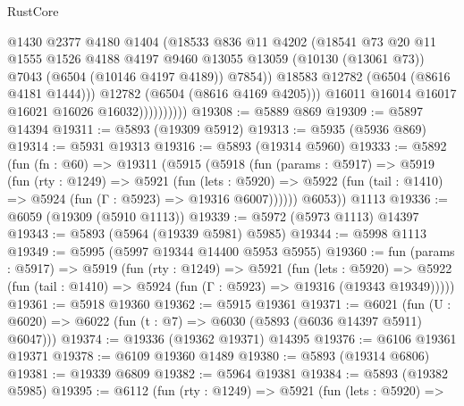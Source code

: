 \begin{lexlean}{RustCore}
\begin{coremodule}
                            @1430
                            @2377
                            @4180
                            @1404
                            (@18533
                              @836
                              @11
                              @4202
                              (@18541
                                @73
                                @20
                                @11
                                @1555
                                @1526
                                @4188
                                @4197
                                @9460
                                @13055
                                @13059
                                (@10130 (@13061 @73))
                                @7043
                                (@6504 (@10146 @4197 @4189))
                                @7854))
                            @18583
                            @12782
                            (@6504 (@8616 @4181 @1444)))
                          @12782
                          (@6504 (@8616 @4169 @4205)))
                        @16011
                        @16014
                        @16017
                        @16021
                        @16026
                        @16032))))))))))
@19308 := @5889 @869
@19309 := @5897 @14394
@19311 := @5893 (@19309 @5912)
@19313 := @5935 (@5936 @869)
@19314 := @5931 @19313
@19316 := @5893 (@19314 @5960)
@19333 := @5892
    (fun (fn : @60) =>
    @19311
      (@5915
        (@5918
          (fun (params : @5917) =>
          @5919
            (fun (rty : @1249) =>
            @5921
              (fun (lets : @5920) =>
              @5922 (fun (tail : @1410) => @5924 (fun (Γ : @5923) => @19316 @6007))))))
        @6053))
    @1113
@19336 := @6059 (@19309 (@5910 @1113))
@19339 := @5972 (@5973 @1113) @14397
@19343 := @5893 (@5964 (@19339 @5981) @5985)
@19344 := @5998 @1113
@19349 := @5995 (@5997 @19344 @14400 @5953 @5955)
@19360 := fun (params : @5917) =>
  @5919
    (fun (rty : @1249) =>
    @5921
      (fun (lets : @5920) =>
      @5922 (fun (tail : @1410) => @5924 (fun (Γ : @5923) => @19316 (@19343 @19349)))))
@19361 := @5918 @19360
@19362 := @5915 @19361
@19371 := @6021
    (fun (U : @6020) => @6022 (fun (t : @7) => @6030 (@5893 (@6036 @14397 @5911) @6047)))
@19374 := @19336 (@19362 @19371) @14395
@19376 := @6106 @19361 @19371
@19378 := @6109 @19360 @1489
@19380 := @5893 (@19314 @6806)
@19381 := @19339 @6809
@19382 := @5964 @19381
@19384 := @5893 (@19382 @5985)
@19395 := @6112
    (fun (rty : @1249) =>
    @5921
      (fun (lets : @5920) =>

\end{coremodule}
\end{lexlean}
